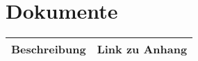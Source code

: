 \chapter{Dokumente}
\begin{center}
\begin{tabular}{|p{12cm}|c|}
\hline 
Beschreibung & Link zu Anhang \\ 
\hline 
\hline 
\hline 
\end{tabular}
\end{center}